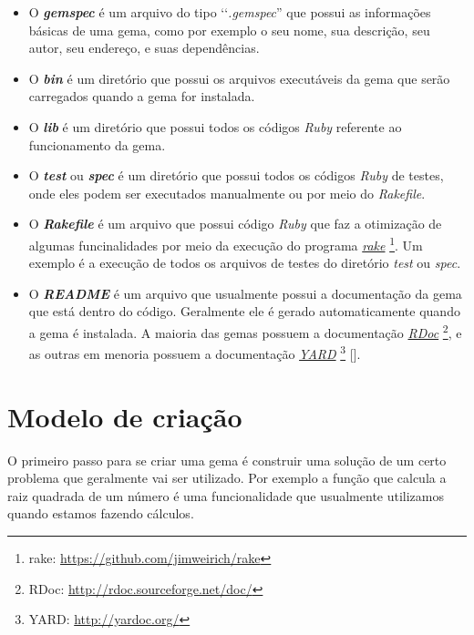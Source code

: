 \begin{itemize}

 \item O \emph{\textbf{gemspec}} é um arquivo do tipo ‘‘\emph{.gemspec}'' que possui as informações básicas 
 de uma gema, como por exemplo o seu nome, sua descrição, seu autor, seu endereço, e suas dependências.

 \item O \emph{\textbf{bin}} é um diretório que possui os arquivos executáveis da gema que serão 
 carregados quando a gema for instalada.

 \item O \emph{\textbf{lib}} é um diretório que possui todos os códigos \emph{Ruby} referente ao 
 funcionamento da gema.

 \item O \emph{\textbf{test}} ou \emph{\textbf{spec}} é um diretório que possui todos os códigos \emph{Ruby} 
 de testes, onde eles podem ser executados manualmente ou por meio do \emph{Rakefile}.

 \item O \emph{\textbf{Rakefile}} é um arquivo que possui código \emph{Ruby} que faz a otimização de algumas
 funcinalidades por meio da execução do programa \emph{\href{https://github.com/jimweirich/rake}{rake}} 
\footnote{rake: \url{https://github.com/jimweirich/rake}}. Um exemplo é a execução de todos os arquivos 
de testes do diretório \emph{test} ou \emph{spec}.

 \item O \emph{\textbf{README}} é um arquivo que usualmente possui a documentação da gema que está dentro do 
 código. Geralmente ele é gerado automaticamente quando a gema é instalada. A maioria das gemas possuem
 a documentação \emph{\href{http://rdoc.sourceforge.net/doc/}{RDoc}} 
 \footnote{RDoc: \url{http://rdoc.sourceforge.net/doc/}}, e as outras em menoria possuem a documentação 
 \emph{\href{http://yardoc.org/}{YARD}} \footnote{YARD: \url{http://yardoc.org/}} 
 [].

\end{itemize}

\section{Modelo de criação}
\label{section:modelo_de_criação}

O primeiro passo para se criar uma gema é construir uma solução de um certo problema que geralmente vai
ser utilizado. Por exemplo a função que calcula a raiz quadrada de um número é uma funcionalidade que 
usualmente utilizamos quando estamos fazendo cálculos. 

